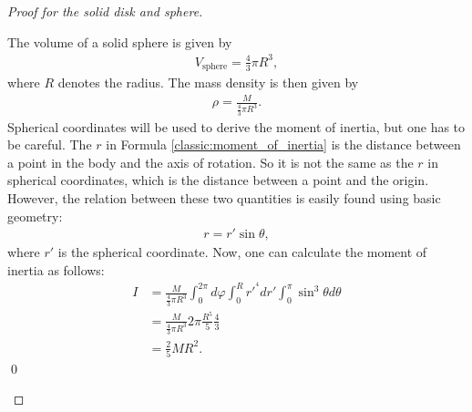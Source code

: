 \begin{example}
\begin{proof}[Proof for the solid disk and sphere]
\begin{mdframed}[roundcorner=10pt, linecolor=blue, linewidth=1pt]
                The volume of a solid sphere is given by
                \begin{gather}
                    V_\mathrm{sphere} = \frac{4}{3}\pi R^3,
                \end{gather}
                where $R$ denotes the radius. The mass density is then given by
                \begin{gather}
                    \rho = \frac{M}{\frac{4}{3}\pi R^3}.
                \end{gather}
                Spherical coordinates will be used to derive the moment of inertia, but one has to be careful. The $r$ in Formula \ref{classic:moment_of_inertia} is the distance between a point in the body and the axis of rotation. So it is not the same as the $r$ in spherical coordinates, which is the distance between a point and the origin. However, the relation between these two quantities is easily found using basic geometry:
                \begin{gather}
                    r = r'\sin\theta,
                \end{gather}
                where $r'$ is the spherical coordinate. Now, one can calculate the moment of inertia as follows:
                \begin{align}
                    I &= \frac{M}{\frac{4}{3}\pi R^3} \int_0^{2\pi}d\varphi\int_0^Rr'^{^4}dr'\int_0^\pi\sin^3\theta d\theta\nonumber\\
                    &= \frac{M}{\frac{4}{3}\pi R^3} 2\pi\frac{R^5}{5}\frac{4}{3}\nonumber\\
                    &= \frac{2}{5}MR^2.
                \end{align}\qed
            \end{mdframed}
        \end{proof}
    \end{example}


